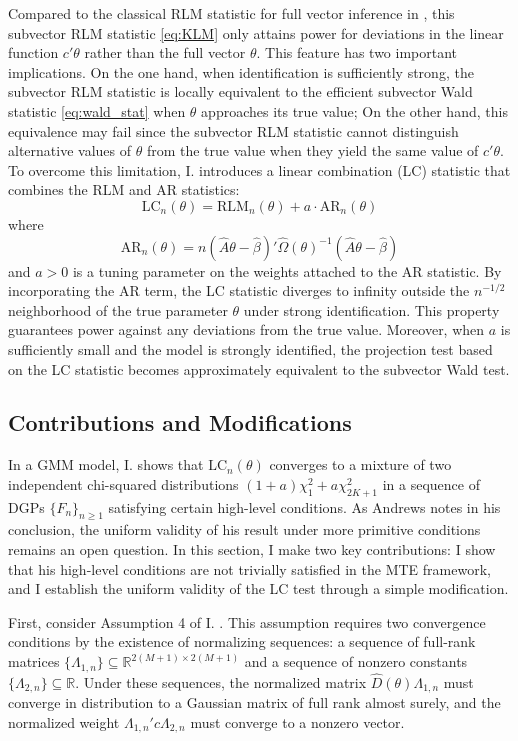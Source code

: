 \documentclass[11pt]{article}
\theoremstyle{definition}
\newcommand{\R}{\ensuremath{\mathbb{R}}}
\newcommand{\0}{\ensuremath{\mathbf{0}}}
\begin{document}
\begin{bibunit}
Compared to the classical RLM statistic for full vector inference in \cite{kleibergen:2005}, this subvector RLM statistic \eqref{eq:KLM} only attains power for deviations in the linear function $c'\theta$ rather than the full vector $\theta$.  This feature has two important implications. On the one hand, when identification is sufficiently strong, the subvector RLM statistic is locally equivalent to the efficient subvector Wald statistic \eqref{eq:wald_stat} when $\theta$ approaches its true value; On the other hand, this equivalence may fail since the subvector RLM statistic cannot distinguish alternative values of $\theta$ from the true value when they yield the same value of $c'\theta$. To overcome this  limitation, I. \cite{andrews.i:2018} introduces a linear combination (LC) statistic that combines the RLM and AR statistics:
\begin{equation}
\label{eq:lc_stat}
	\text{LC}_n(\theta) = \text{RLM}_n(\theta) + a \cdot \text{AR}_n(\theta)
\end{equation}
where
\[
	\text{AR}_n(\theta) = n(\hat{A}\theta - \hat{\beta})'\hat{\Omega}(\theta)^{-1}(\hat{A}\theta - \hat{\beta})
\]
and $a > 0$ is a tuning parameter on the weights attached to the AR statistic. By incorporating the AR term, the LC statistic diverges to infinity outside the $n^{-1/2}$ neighborhood of the true parameter $\theta$ under strong identification. This property guarantees power against any deviations from the true value. Moreover, when $a$ is sufficiently small and the model is strongly identified, the projection test based on the LC statistic becomes approximately equivalent to the subvector Wald test.

\subsection{Contributions and Modifications}
In a GMM model, I. \cite{andrews.i:2018} shows that $\text{LC}_n(\theta)$ converges to a mixture of two independent chi-squared distributions $(1+a)\chi^2_{1} + a\chi^2_{2K+1}$ in a sequence of DGPs $\{F_n\}_{n\geq 1}$ satisfying certain high-level conditions. As Andrews notes in his conclusion, the uniform validity of his result under more primitive conditions remains an open question. In this section, I make two key contributions: I show that his high-level conditions are not trivially satisfied in the MTE framework, and I establish the uniform validity of the LC test through a simple modification.

First, consider Assumption 4 of I. \citet{andrews.i:2018}. This assumption requires two convergence conditions by the existence of normalizing sequences: a sequence of full-rank matrices $\{\Lambda_{1,n}\}\subseteq \R^{2(M+1)\times 2(M+1)}$ and a sequence of nonzero constants $\{\Lambda_{2,n}\} \subseteq \R$. Under these sequences, the normalized matrix $\hat{D}(\theta)\Lambda_{1,n}$ must converge in distribution to a Gaussian matrix of full rank almost surely, and the normalized weight $\Lambda_{1,n}'c\Lambda_{2,n}$ must converge to a nonzero vector.


\end{bibunit}
\end{document}
